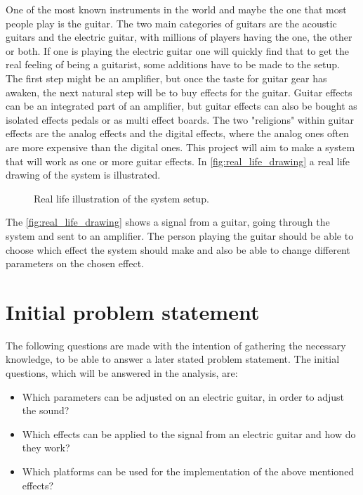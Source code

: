 One of the most known instruments in the world and maybe the one that most people play is the guitar. The two main categories of guitars are the acoustic guitars and the electric guitar, with millions of players having the one, the other or both. If one is playing the electric guitar one will quickly find that to get the real feeling of being a guitarist, some additions have to be made to the setup. The first step might be an amplifier, but once the taste for guitar gear has awaken, the next natural step will be to buy effects for the guitar. Guitar effects can be an integrated part of an amplifier, but guitar effects can also be bought as isolated effects pedals or as multi effect boards. The two "religions" within guitar effects are the analog effects and the digital effects, where the analog ones often are more expensive than the digital ones. 
This project will aim to make a system that will work as one or more guitar effects. In \autoref{fig:real_life_drawing} a real life drawing of the system is illustrated.

\begin{figure}[htbp]
\centering
\def\svgwidth{\columnwidth}
\scalebox{0.7}{}
\caption{Real life illustration of the system setup.}
		\label{fig:real_life_drawing}
\end{figure}

The \autoref{fig:real_life_drawing} shows a signal from a guitar, going through the system and sent to an amplifier. The person playing the guitar should be able to choose which effect the system should make and also be able to change different parameters on the chosen effect. 



\section{Initial problem statement}
The following questions are made with the intention of gathering the necessary knowledge, to be able to answer a later stated problem statement. The initial questions, which will be answered in the analysis, are:

\begin{itemize}
\item Which parameters can be adjusted on an electric guitar, in order to adjust the sound?
\item Which effects can be applied to the signal from an electric guitar and how do they work?
\item Which platforms can be used for the implementation of the above mentioned effects? 
\end{itemize}